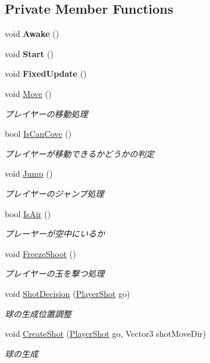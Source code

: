 \subsection*{Private Member Functions}
\begin{DoxyCompactItemize}
\item 
\mbox{\label{class_player_aaddfa9f3b558df64f5d1d09e2b906901}} 
void {\bfseries Awake} ()
\item 
\mbox{\label{class_player_a1a09a3ded16ac1646f6bdd4f25fe0ddd}} 
void {\bfseries Start} ()
\item 
\mbox{\label{class_player_aa0458562e3da0655ecb39a0031114335}} 
void {\bfseries Fixed\+Update} ()
\item 
void \hyperlink{class_player_a3fdebad803b97f4643696b3421be2195}{Move} ()
\begin{DoxyCompactList}\small\item\em プレイヤーの移動処理 \end{DoxyCompactList}\item 
bool \hyperlink{class_player_ab2fd8fba7de97ea1d0c4e7821d29c661}{Is\+Can\+Cove} ()
\begin{DoxyCompactList}\small\item\em プレイヤーが移動できるかどうかの判定 \end{DoxyCompactList}\item 
void \hyperlink{class_player_a689d6b007b09f694a246fe806bef7d5f}{Jump} ()
\begin{DoxyCompactList}\small\item\em プレイヤーのジャンプ処理 \end{DoxyCompactList}\item 
bool \hyperlink{class_player_a9d75eb5e439284a9e14334de881e59c3}{Is\+Air} ()
\begin{DoxyCompactList}\small\item\em プレーヤーが空中にいるか \end{DoxyCompactList}\item 
void \hyperlink{class_player_a2c4d3671ace6954258733b6f49c68764}{Freeze\+Shoot} ()
\begin{DoxyCompactList}\small\item\em プレイヤーの玉を撃つ処理 \end{DoxyCompactList}\item 
void \hyperlink{class_player_a3f5753ef7b1f00fb358eab8b6df132cf}{Shot\+Decision} (\hyperlink{class_player_shot}{Player\+Shot} go)
\begin{DoxyCompactList}\small\item\em 球の生成位置調整 \end{DoxyCompactList}\item 
void \hyperlink{class_player_a2ae58096ded4d63ab46232618cb6f1a4}{Create\+Shot} (\hyperlink{class_player_shot}{Player\+Shot} go, Vector3 shot\+Move\+Dir)
\begin{DoxyCompactList}\small\item\em 球の生成 \end{DoxyCompactList}\end{DoxyCompactItemize}
